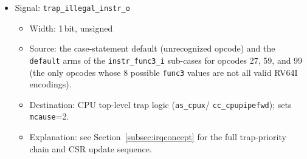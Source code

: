 \begin{itemize}
\begin{itemize}
    \item Source: opcode 99 (branches, via \texttt{instr\_func3\_i}) and
      opcodes 103/111 (\texttt{jalr}/\texttt{jal}, unconditional).
    \item Destination: Branch ALU operation select (\texttt{take\_o}
      generation, both chip variants -- see Section~\ref{sec:alufunc01}).
    \item Explanation: \[ \begin{array}{ll}
                                              0 \Rightarrow & \texttt{BR\_NONE} \mbox{ (default, no branch/jump)} \\
                                              1 \Rightarrow & \texttt{BR\_EQ} \mbox{ (beq)} \\
                                              2 \Rightarrow & \texttt{BR\_NE} \mbox{ (bne)} \\
                                              3 \Rightarrow & \texttt{BR\_LT} \mbox{ (blt)} \\
                                              4 \Rightarrow & \texttt{BR\_GE} \mbox{ (bge)} \\
                                              5 \Rightarrow & \texttt{BR\_LTU} \mbox{ (bltu)} \\
                                              6 \Rightarrow & \texttt{BR\_GEU} \mbox{ (bgeu)} \\
                                              7 \Rightarrow & \texttt{BR\_ALWAYS} \mbox{ (jal, jalr -- unconditional)}
                                              \end{array} \]
  \end{itemize}
  \item Signal: \texttt{trap\_illegal\_instr\_o}
  \begin{itemize}
    \item Width: 1\,bit, unsigned
    \item Source: the case-statement default (unrecognized opcode) and the
      \texttt{default} arms of the \texttt{instr\_func3\_i} sub-cases for
      opcodes 27, 59, and 99 (the only opcodes whose 8 possible
      \texttt{func3} values are not all valid RV64I encodings).
    \item Destination: CPU top-level trap logic (\texttt{as\_cpux}/
      \texttt{cc\_cpupipefwd}); sets \texttt{mcause}=2.
    \item Explanation: see Section~\ref{subsec:irqconcept} for the full
      trap-priority chain and CSR update sequence.
  \end{itemize}
\end{itemize}
